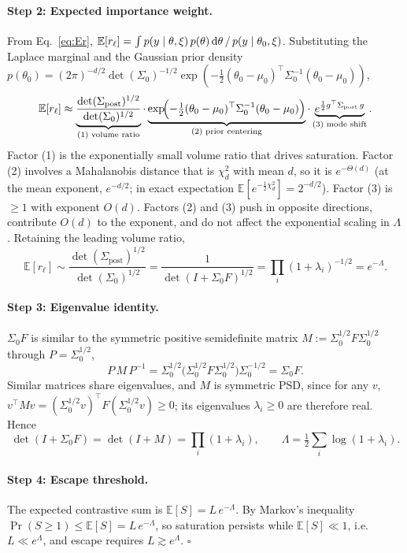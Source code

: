 \paragraph{Step 2: Expected importance weight.}
From Eq.~\eqref{eq:Er}, $\mathbb{E}[r_\ell]=\int p(y\mid\theta,\xi)\,p(\theta)\,\mathrm{d}\theta\,/\,p(y\mid\theta_0,\xi)$.
Substituting the Laplace marginal and the Gaussian prior density
$p(\theta_0)=(2\pi)^{-d/2}\det(\Sigma_0)^{-1/2}\exp(-\tfrac12(\theta_0-\mu_0)^\top\Sigma_0^{-1}(\theta_0-\mu_0))$,
\[
\mathbb{E}[r_\ell] \approx \underbrace{\frac{\det(\Sigma_{\mathrm{post}})^{1/2}}{\det(\Sigma_0)^{1/2}}}_{\text{(1) volume ratio}} \cdot \underbrace{\exp\!\Bigl(-\tfrac12(\theta_0-\mu_0)^\top\Sigma_0^{-1}(\theta_0-\mu_0)\Bigr)}_{\text{(2) prior centering}} \cdot \underbrace{e^{\frac12 g^\top\Sigma_{\mathrm{post}}\,g}}_{\text{(3) mode shift}}.
\]
Factor (1) is the exponentially small volume ratio that drives saturation. Factor (2)
involves a Mahalanobis distance that is $\chi^2_d$ with mean $d$, so it is
$e^{-\Theta(d)}$ (at the mean exponent, $e^{-d/2}$; in exact expectation
$\mathbb{E}[e^{-\frac12\chi^2_d}]=2^{-d/2}$). Factor (3) is $\ge1$ with exponent
$O(d)$. Factors (2) and (3) push in opposite directions, contribute $O(d)$ to the
exponent, and do not affect the exponential scaling in $\Lambda$. Retaining the
leading volume ratio,
\[
\mathbb{E}[r_\ell]\sim\frac{\det(\Sigma_{\mathrm{post}})^{1/2}}{\det(\Sigma_0)^{1/2}}=\frac{1}{\det(I+\Sigma_0 F)^{1/2}}=\prod_i(1+\lambda_i)^{-1/2}=e^{-\Lambda}.
\]

\paragraph{Step 3: Eigenvalue identity.}
$\Sigma_0 F$ is similar to the symmetric positive semidefinite matrix
$M:=\Sigma_0^{1/2}F\Sigma_0^{1/2}$ through $P=\Sigma_0^{1/2}$,
\[
P\,M\,P^{-1}=\Sigma_0^{1/2}\bigl(\Sigma_0^{1/2}F\Sigma_0^{1/2}\bigr)\Sigma_0^{-1/2}=\Sigma_0 F .
\]
Similar matrices share eigenvalues, and $M$ is symmetric PSD, since for any $v$,
$v^\top M v=(\Sigma_0^{1/2}v)^\top F(\Sigma_0^{1/2}v)\ge0$; its eigenvalues
$\lambda_i\ge0$ are therefore real. Hence
\[
\det(I+\Sigma_0 F)=\det(I+M)=\prod_i(1+\lambda_i),
\qquad \Lambda=\tfrac12\sum_i\log(1+\lambda_i).
\]

\paragraph{Step 4: Escape threshold.}
The expected contrastive sum is $\mathbb{E}[S]=L\,e^{-\Lambda}$. By Markov's
inequality $\Pr(S\ge1)\le\mathbb{E}[S]=L\,e^{-\Lambda}$, so saturation persists while
$\mathbb{E}[S]\ll1$, i.e.\ $L\ll e^{\Lambda}$, and escape requires
$L\gtrsim e^{\Lambda}$. $\square$

